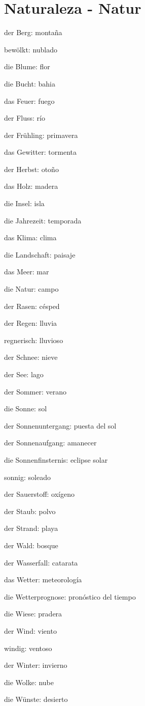 \section{Naturaleza - Natur}
\begin{multicols}{2}
\begin{myitemize}
\item der Berg: montaña
\item bewölkt: nublado
\item die Blume: flor
\item die Bucht: bahia
\item das Feuer: fuego
\item der Fluss: río
\item der Frühling: primavera
\item das Gewitter: tormenta
\item der Herbst: otoño
\item das Holz: madera
\item die Insel: isla
\item die Jahrezeit: temporada
\item das Klima: clima
\item die Landschaft: paisaje
\item das Meer: mar
\item die Natur: campo
\item der Rasen: césped
\item der Regen: lluvia
\item regnerisch: lluvioso
\item der Schnee: nieve
\item der See: lago
\item der Sommer: verano
\item die Sonne: sol
\item der Sonnenuntergang: puesta del sol
\item der Sonnenaufgang: amanecer
\item die Sonnenfinsternis: eclipse solar
\item sonnig: soleado
\item der Sauerstoff: oxígeno
\item der Staub: polvo
\item der Strand: playa
\item der Wald: bosque
\item der Wasserfall: catarata
\item das Wetter: meteorología
\item die Wetterprognose: pronóstico del tiempo
\item die Wiese: pradera
\item der Wind: viento
\item windig: ventoso
\item der Winter: invierno
\item die Wolke: nube
\item die Wünste: desierto
\end{myitemize}
\end{multicols}


